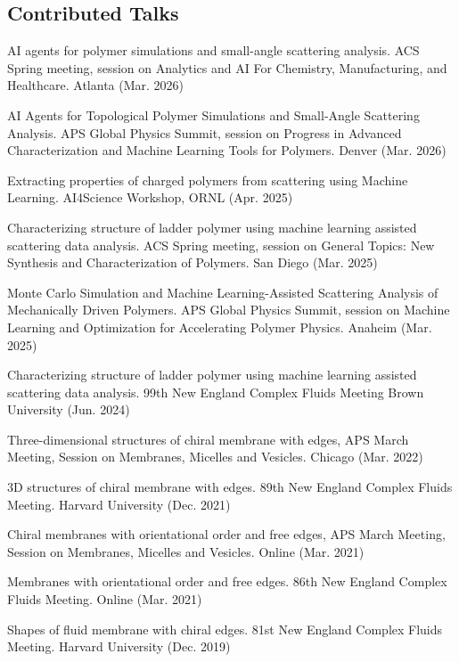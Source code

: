 \documentclass[11pt,letterpaper]{article}
\begin{document}
\subsection*{Contributed Talks}
\begin{etaremune}
    \item AI agents for polymer simulations and small-angle scattering analysis. ACS Spring meeting, session on Analytics and AI For Chemistry, Manufacturing, and Healthcare. Atlanta (Mar. 2026)
    \item AI Agents for Topological Polymer Simulations and Small-Angle Scattering Analysis. APS Global Physics Summit, session on Progress in Advanced Characterization and Machine Learning Tools for Polymers. Denver (Mar. 2026)
    \item Extracting properties of charged polymers from scattering using Machine Learning. AI4Science Workshop, ORNL (Apr. 2025)
    \item Characterizing structure of ladder polymer using machine learning assisted scattering data analysis. ACS Spring meeting, session on General Topics: New Synthesis and Characterization of Polymers. San Diego (Mar. 2025)
    \item Monte Carlo Simulation and Machine Learning-Assisted Scattering Analysis of Mechanically Driven Polymers. APS Global Physics Summit, session on Machine Learning and Optimization for Accelerating Polymer Physics. Anaheim (Mar. 2025)
    \item Characterizing structure of ladder polymer using machine learning assisted scattering data analysis. 99th New England Complex Fluids Meeting Brown University (Jun. 2024)
    \item Three-dimensional structures of chiral membrane with edges, APS March Meeting, Session on Membranes, Micelles and Vesicles. Chicago (Mar. 2022)
    \item 3D structures of chiral membrane with edges. 89th New England Complex Fluids Meeting. Harvard University (Dec. 2021)
    \item Chiral membranes with orientational order and free edges, APS March Meeting, Session on Membranes, Micelles and Vesicles. Online (Mar. 2021)
    \item Membranes with orientational order and free edges. 86th New England Complex Fluids Meeting. Online (Mar. 2021)
    \item Shapes of fluid membrane with chiral edges. 81st New England Complex Fluids Meeting. Harvard University (Dec. 2019)
\end{etaremune}
\end{document}
